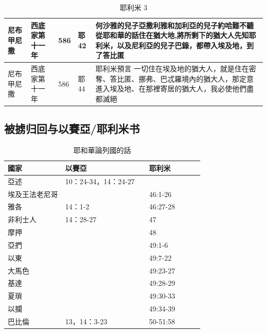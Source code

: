 \begin{table}[!hbp]
\begin{tabular}{|p{1.8cm}|p{2cm}|p{1.5cm}|p{1.7cm}|p{8.5cm}| }
尼布甲尼撒 &西底家第十一年  &586&耶42  &何沙雅的兒子亞撒利雅和加利亞的兒子約哈難不聽從耶和華的話住在猶大地,將所剩下的猶大人先知耶利米，以及尼利亞的兒子巴錄，都帶入埃及地，到了答比匿\\\hline



尼布甲尼撒 &西底家第十一年  &586&耶44  &耶利米預言 一切住在埃及地的猶大人，就是住在密奪、答比匿、挪弗、巴忒羅境內的猶大人，那定意進入埃及地、在那裡寄居的猶大人，我必使他們盡都滅絕\\\hline
\end{tabular}
\caption{耶利米 3}
\end{table}

\subsection{被掳归回与以賽亞/耶利米书}
\begin{table}[!hbp]
\centering 
\begin{tabular}{|p{3cm}|p{ 2cm}|p{2cm}|p{ 2cm}|p{2cm}|p{ 2cm}| }
\hline
\hline

國家 &以賽亞　&耶利米 \\\hline
亞述 &10：24-34，14：24-27　& \\\hline
  埃及王法老尼哥& & 46:1-26\\\hline
  雅各 & 14：1-2& 46:27-28 \\\hline
   非利士人&14：28-27 & 47\\\hline

 摩押& & 48\\\hline
 亞捫& & 49:1-6  \\\hline
  以東& & 49:7-22  \\\hline
 
  大馬色&& 49:23-27\\\hline
  基達&& 49:28-29  \\\hline 
  夏瑣& &49:30-33\\\hline
  
 以攔 & &49:34-39\\\hline
   巴比倫 &13，14：3-23& 50-51:58\\\hline 
 
\end{tabular}
\caption{耶和華論列國的話}
\end{table}




